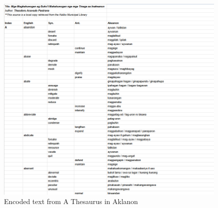 \begin{figure}[h!]
	\centering
	\includegraphics[width=\textwidth]{./figures/thesaurus.png}
	\caption{Encoded text from A Thesaurus in Aklanon}
	\label{fig:A Thesaurus in Aklanon by Pastrana (2012)}
\end{figure}
